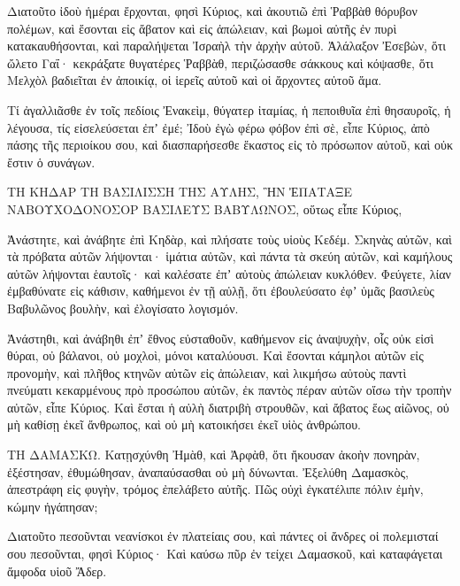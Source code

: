 {Διατοῦτο ἰδοὺ ἡμέραι ἔρχονται, φησὶ Κύριος, καὶ ἀκουτιῶ ἐπὶ Ῥαββὰθ θόρυβον πολέμων, καὶ ἔσονται εἰς ἄβατον καὶ εἰς ἀπώλειαν, καὶ βωμοὶ αὐτῆς ἐν πυρὶ κατακαυθήσονται, καὶ παραλήψεται Ἰσραὴλ τὴν ἀρχὴν αὐτοῦ.
Ἀλάλαξον Ἐσεβὼν, ὅτι ὤλετο Γαΐ· κεκράξατε θυγατέρες Ῥαββὰθ, περιζώσασθε σάκκους καὶ κόψασθε, ὅτι Μελχὸλ βαδιεῖται ἐν ἀποικίᾳ, οἱ ἱερεῖς αὐτοῦ καὶ οἱ ἄρχοντες αὐτοῦ ἅμα.
\par }{\PP {}Τί ἀγαλλιᾶσθε ἐν τοῖς πεδίοις Ἐνακεὶμ, θύγατερ ἰταμίας, ἡ πεποιθυῖα ἐπὶ θησαυροῖς, ἡ λέγουσα, τίς εἰσελεύσεται ἐπʼ ἐμέ;
Ἰδοὺ ἐγὼ φέρω φόβον ἐπὶ σὲ, εἶπε Κύριος, ἀπὸ πάσης τῆς περιοίκου σου, καὶ διασπαρήσεσθε ἕκαστος εἰς τὸ πρόσωπον αὐτοῦ, καὶ οὐκ ἔστιν ὁ συνάγων.
\par }{\PP {}ΤΗ ΚΗΔΑΡ ΤΗ ΒΑΣΙΛΙΣΣΗ ΤΗΣ ΑΥΛΗΣ, ἫΝ ἘΠΑΤΑΞΕ ΝΑΒΟΥΧΟΔΟΝΟΣΟΡ ΒΑΣΙΛΕΥΣ ΒΑΒΥΛΩΝΟΣ, οὕτως εἶπε Κύριος,
\par }{\PP Ἀνάστητε, καὶ ἀνάβητε ἐπὶ Κηδὰρ, καὶ πλήσατε τοὺς υἱοὺς Κεδέμ.
Σκηνὰς αὐτῶν, καὶ τὰ πρόβατα αὐτῶν λήψονται· ἱμάτια αὐτῶν, καὶ πάντα τὰ σκεύη αὐτῶν, καὶ καμήλους αὐτῶν λήψονται ἑαυτοῖς· καὶ καλέσατε ἐπʼ αὐτοὺς ἀπώλειαν κυκλόθεν.
Φεύγετε, λίαν ἐμβαθύνατε εἰς κάθισιν, καθήμενοι ἐν τῇ αὐλῇ, ὅτι ἐβουλεύσατο ἐφʼ ὑμᾶς βασιλεὺς Βαβυλῶνος βουλὴν, καὶ ἐλογίσατο λογισμόν.
\par }{\PP {}Ἀνάστηθι, καὶ ἀνάβηθι ἐπʼ ἔθνος εὐσταθοῦν, καθήμενον εἰς ἀναψυχὴν, οἷς οὐκ εἰσὶ θύραι, οὐ βάλανοι, οὐ μοχλοὶ, μόνοι καταλύουσι.
Καὶ ἔσονται κάμηλοι αὐτῶν εἰς προνομὴν, καὶ πλῆθος κτηνῶν αὐτῶν εἰς ἀπώλειαν, καὶ λικμήσω αὐτοὺς παντὶ πνεύματι κεκαρμένους πρὸ προσώπου αὐτῶν, ἐκ παντὸς πέραν αὐτῶν οἴσω τὴν τροπὴν αὐτῶν, εἶπε Κύριος.
Καὶ ἔσται ἡ αὐλὴ διατριβὴ στρουθῶν, καὶ ἄβατος ἕως αἰῶνος, οὐ μὴ καθίσῃ ἐκεῖ ἄνθρωπος, καὶ οὐ μὴ κατοικήσει ἐκεῖ υἱὸς ἀνθρώπου.
\par }{\PP {}ΤΗ ΔΑΜΑΣΚΩ. Κατῃσχύνθη Ἠμὰθ, καὶ Ἀρφὰθ, ὅτι ἤκουσαν ἀκοὴν πονηρὰν, ἐξέστησαν, ἐθυμώθησαν, ἀναπαύσασθαι οὐ μὴ δύνωνται.
Ἐξελύθη Δαμασκὸς, ἀπεστράφη εἰς φυγὴν, τρόμος ἐπελάβετο αὐτῆς.
Πῶς οὐχὶ ἐγκατέλιπε πόλιν ἐμὴν, κώμην ἠγάπησαν;
\par }{\PP {}Διατοῦτο πεσοῦνται νεανίσκοι ἐν πλατείαις σου, καὶ πάντες οἱ ἄνδρες οἱ πολεμισταί σου πεσοῦνται, φησὶ Κύριος·
Καὶ καύσω πῦρ ἐν τείχει Δαμασκοῦ, καὶ καταφάγεται ἄμφοδα υἱοῦ Ἄδερ.

}
